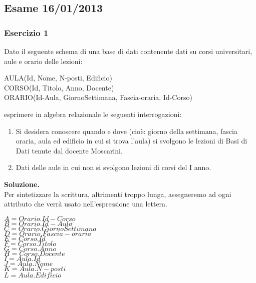   
  
  
  \newpage
  \subsection{Esame 16/01/2013}
  \subsubsection{Esercizio 1}
  Dato il seguente schema di una base di dati contenente dati su corsi universitari, aule e orario delle lezioni:
  \begin{center}
  AULA(Id, Nome, N-posti, Edificio)\\
  CORSO(Id, Titolo, Anno, Docente) \\
  ORARIO(Id-Aula, GiornoSettimana, Fascia-oraria, Id-Corso)\\ 
  \end{center}
  esprimere in algebra relazionale le seguenti interrogazioni:
  \begin{enumerate}
   \item Si desidera conoscere quando e dove (cioè: giorno della settimana, fascia oraria, aula ed edificio in cui 
   si trova l'aula) si svolgono le lezioni di Basi di Dati tenute dal docente Moscarini.
   \item Dati delle aule in cui non si svolgono lezioni di corsi del I anno.
  \end{enumerate}
  \noindent\textbf{\fontsize{14pt}{1em}Soluzione.}\\
  Per sintetizzare la scrittura, altrimenti troppo lunga, assegneremo ad ogni attributo che verrà usato
  nell'espressione una lettera.
  
  \begin{multicols}{3}
  \begin{flushleft}
   $A = Orario.Id-Corso$\\
   $B = Orario.Id-Aula$\\
   $C = Orario.GiornoSettimana$\\
   $D = Orario.Fascia-oraria$\\
   $E = Corso.Id$\\
   $F = Corso.Titolo$\\
   $G = Corso.Anno$\\
   $H = Corso.Docente$\\
   $I = Aula.Id$\\
   $J = Aula.Nome$\\
   $K = Aula.N-posti$\\
   $L = Aula.Edificio$\\
  \end{flushleft}
  \end{multicols}

